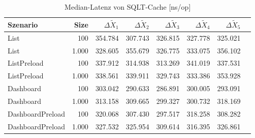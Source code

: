 
\begin{table}[ht]
\setlength{\extrarowheight}{-1pt}
\centering
\caption{Median-Latenz von SQLT-Cache [ns/op]}
\begin{tabular}{lrrrrrrr}
\toprule
Szenario & Size & ${\Delta \tilde{X}_1}$ & ${\Delta \tilde{X}_2}$ & ${\Delta \tilde{X}_3}$ & ${\Delta \tilde{X}_4}$ & ${\Delta \tilde{X}_5}$ \\
\midrule
	List & 100 & \cellcolor{red!9}  354.784 & \cellcolor{red!2}  307.743 & \cellcolor{red!1}  326.815 & \cellcolor{red!2}  327.778 & \cellcolor{red!1}  325.021 \\
	List & 1.000 & \cellcolor{red!2}  328.605 & \cellcolor{red!3}  355.679 & \cellcolor{red!2}  326.775 & \cellcolor{green!1}  333.075 & \cellcolor{red!2}  356.102 \\
	ListPreload & 100 & \cellcolor{red!2}  337.912 & \cellcolor{red!1}  314.938 & \cellcolor{red!1}  313.269 & \cellcolor{red!1}  341.019 & \cellcolor{red!1}  337.531 \\
	ListPreload & 1.000 & \cellcolor{red!1}  338.561 & \cellcolor{green!1}  339.911 & \cellcolor{red!1}  329.743 & \cellcolor{red!1}  333.386 & \cellcolor{green!1}  353.928 \\
	Dashboard & 100 & \cellcolor{green!6}  303.042 & \cellcolor{green!6}  290.633 & \cellcolor{green!8}  286.891 & \cellcolor{green!4}  300.005 & \cellcolor{green!6}  293.091 \\
	Dashboard & 1.000 & \cellcolor{green!6}  313.158 & \cellcolor{green!10}  309.665 & \cellcolor{green!6}  299.327 & \cellcolor{green!10}  300.732 & \cellcolor{green!10}  318.169 \\
	DashboardPreload & 100 & \cellcolor{green!1}  320.068 & \cellcolor{green!4}  307.430 & \cellcolor{green!6}  297.517 & \cellcolor{green!3}  318.258 & \cellcolor{green!4}  308.282 \\
	DashboardPreload & 1.000 & \cellcolor{green!4}  327.532 & \cellcolor{green!5}  325.954 & \cellcolor{green!4}  309.614 & \cellcolor{green!4}  316.395 & \cellcolor{green!6}  326.861 \\
\bottomrule
\end{tabular}
\label{tab:latenz_sqltcache}
\end{table}
	